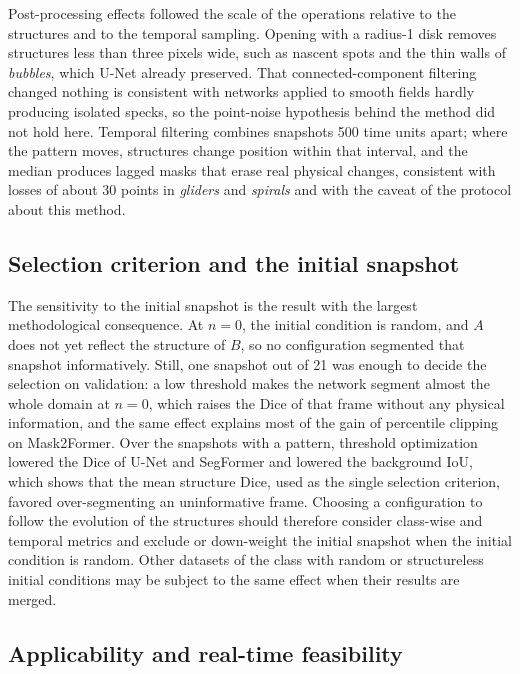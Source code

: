 \documentclass[final,5p,times,twocolumn]{elsarticle}
\begin{document}
Post-processing effects followed the scale of the operations relative to the structures and to the temporal sampling. Opening with a radius-1 disk removes structures less than three pixels wide, such as nascent spots and the thin walls of \textit{bubbles}, which U-Net already preserved. That connected-component filtering changed nothing is consistent with networks applied to smooth fields hardly producing isolated specks, so the point-noise hypothesis behind the method did not hold here. Temporal filtering combines snapshots 500 time units apart; where the pattern moves, structures change position within that interval, and the median produces lagged masks that erase real physical changes, consistent with losses of about 30 points in \textit{gliders} and \textit{spirals} and with the caveat of the protocol about this method.

\subsection{Selection criterion and the initial snapshot}\label{subsec:disc_n0}

The sensitivity to the initial snapshot is the result with the largest methodological consequence. At $n=0$, the initial condition is random, and $A$ does not yet reflect the structure of $B$, so no configuration segmented that snapshot informatively. Still, one snapshot out of 21 was enough to decide the selection on validation: a low threshold makes the network segment almost the whole domain at $n=0$, which raises the Dice of that frame without any physical information, and the same effect explains most of the gain of percentile clipping on Mask2Former. Over the snapshots with a pattern, threshold optimization lowered the Dice of U-Net and SegFormer and lowered the background IoU, which shows that the mean structure Dice, used as the single selection criterion, favored over-segmenting an uninformative frame. Choosing a configuration to follow the evolution of the structures should therefore consider class-wise and temporal metrics and exclude or down-weight the initial snapshot when the initial condition is random. Other datasets of the class with random or structureless initial conditions may be subject to the same effect when their results are merged.

\subsection{Applicability and real-time feasibility}\label{subsec:disc_realtime}
\end{document}
